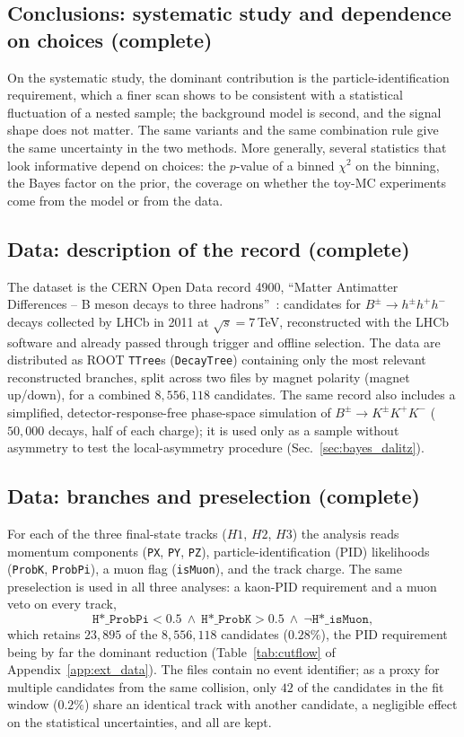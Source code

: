 \subsection{Conclusions: systematic study and dependence on choices (complete)}
On the systematic study, the dominant contribution is the particle-identification requirement, which a finer scan shows to be consistent with a statistical fluctuation of a nested sample; the background model is second, and the signal shape does not matter. The same variants and the same combination rule give the same uncertainty in the two methods. More generally, several statistics that look informative depend on choices: the $p$-value of a binned $\chi^2$ on the binning, the Bayes factor on the prior, the coverage on whether the toy-MC experiments come from the model or from the data.

\subsection{Data: description of the record (complete)}
The dataset is the CERN Open Data record 4900, ``Matter Antimatter Differences -- B meson decays to three hadrons''~\cite{opendata_record}: candidates for $B^{\pm}\to h^{\pm}h^{+}h^{-}$ decays collected by LHCb in 2011 at $\sqrt{s}=7$\,TeV, reconstructed with the LHCb software and already passed through trigger and offline selection. The data are distributed as ROOT \texttt{TTree}s (\texttt{DecayTree}) containing only the most relevant reconstructed branches, split across two files by magnet polarity (magnet up/down), for a combined $8{,}556{,}118$ candidates. The same record also includes a simplified, detector-response-free phase-space simulation of $B^{\pm}\to K^{\pm}K^{+}K^{-}$ ($50{,}000$ decays, half of each charge); it is used only as a sample without asymmetry to test the local-asymmetry procedure (Sec.~\ref{sec:bayes_dalitz}).

\subsection{Data: branches and preselection (complete)}
For each of the three final-state tracks ($H1$, $H2$, $H3$) the analysis reads momentum components (\texttt{PX}, \texttt{PY}, \texttt{PZ}), particle-identification (PID) likelihoods (\texttt{ProbK}, \texttt{ProbPi}), a muon flag (\texttt{isMuon}), and the track charge. The same preselection is used in all three analyses: a kaon-PID requirement and a muon veto on every track,
\[
\texttt{H*\_ProbPi} < 0.5 \ \wedge\ \texttt{H*\_ProbK} > 0.5 \ \wedge\ \lnot\texttt{H*\_isMuon},
\]
which retains $23{,}895$ of the $8{,}556{,}118$ candidates ($0.28\%$), the PID requirement being by far the dominant reduction (Table~\ref{tab:cutflow} of Appendix~\ref{app:ext_data}). The files contain no event identifier; as a proxy for multiple candidates from the same collision, only $42$ of the candidates in the fit window ($0.2\%$) share an identical track with another candidate, a negligible effect on the statistical uncertainties, and all are kept.

